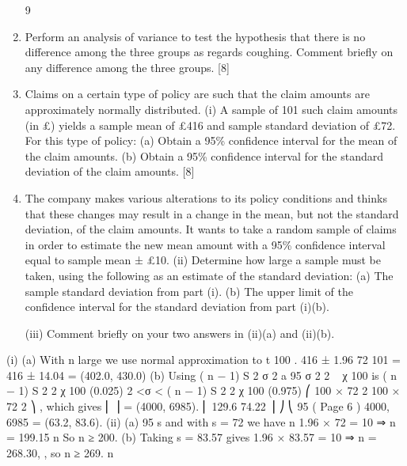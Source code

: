 \documentclass[a4paper,12pt]{article}
\begin{document}
\begin{enumerate}
9
\item Perform an analysis of variance to test the hypothesis that there is no difference among the three groups as regards coughing.
Comment briefly on any difference among the three groups.
[8]
\item
Claims on a certain type of policy are such that the claim amounts are approximately normally distributed.
(i)
A sample of 101 such claim amounts (in £) yields a sample mean of £416 and sample standard deviation of £72. For this type of policy:
(a) Obtain a 95\% confidence interval for the mean of the claim amounts.
(b) Obtain a 95\% confidence interval for the standard deviation of the claim amounts.
[8]
\item The company makes various alterations to its policy conditions and thinks that these changes may result in a change in the mean, but not the standard deviation, of the claim amounts. It wants to take a random sample of claims in order to estimate the
new mean amount with a 95\% confidence interval equal to sample mean ± £10.
(ii)
Determine how large a sample must be taken, using the following as an estimate of the standard deviation:
(a) The sample standard deviation from part (i).
(b) The upper limit of the confidence interval for the standard deviation from part (i)(b).

(iii)
Comment briefly on your two answers in (ii)(a) and (ii)(b).
\end{enumerate}
\newpage


(i) (a)
With n large we use normal approximation to t 100 .
416 ± 1.96
72
101
= 416 ± 14.04 = (402.0, 430.0)
(b)
Using
( n − 1) S 2
σ
2
a 95%
σ 2
2
~ χ 100
is
( n − 1) S 2
2
χ 100
(0.025)
2
<σ <
( n − 1) S 2
2
χ 100
(0.975)
⎛ 100 × 72 2 100 × 72 2 ⎞
,
which gives ⎜
⎟ = (4000, 6985).
⎜ 129.6
74.22 ⎟ ⎠
⎝
95%
(
Page 6
)
4000, 6985 = (63.2, 83.6).
(ii)
(a)
95%
s
and with s = 72 we have
n
1.96 × 72
= 10 ⇒ n = 199.15
n
So n ≥ 200.
(b)
Taking s = 83.57 gives
1.96 × 83.57
= 10 ⇒ n = 268.30, , so n ≥ 269.
n
\end{document}
